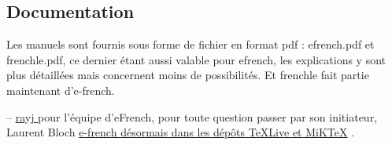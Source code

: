\documentclass[11pt, a4paper]{article}
\begin{document}
\subsection*{Documentation }

Les manuels sont fournis sous forme de fichier en format pdf : 
efrench.pdf et frenchle.pdf, ce dernier étant aussi valable
pour efrench, les explications y sont plus détaillées 
mais concernent moins de possibilités. Et frenchle 
fait partie maintenant d'e-french.


  -- \href{mailto:raymond@juil.ch}{rayj }
 pour l'équipe d'eFrench, pour toute question passer par son initiateur,
{Laurent Bloch}
\href{https://www.laurentbloch.net/MySpip3/e-french-desormais-dans-les-depots?lang=fr}{e-french désormais dans les dépôts TeXLive et MiKTeX} .
\end{document}
